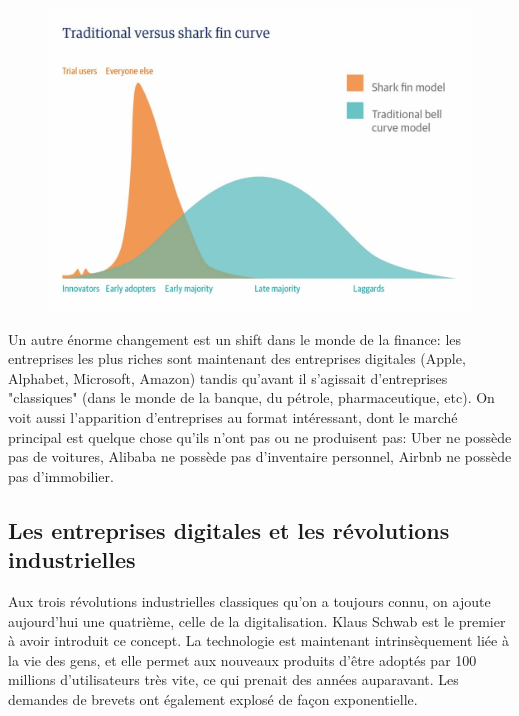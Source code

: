 \begin{figure}[H]
\centering
\includegraphics[scale=0.35]{../images/lec1img1}
\end{figure}

Un autre énorme changement est un shift dans le monde de la finance: les entreprises les plus riches sont maintenant des entreprises digitales (Apple, Alphabet, Microsoft, Amazon) tandis qu'avant il s'agissait d'entreprises "classiques" (dans le monde de la banque, du pétrole, pharmaceutique, etc). On voit aussi l'apparition d'entreprises au format intéressant, dont le marché principal est quelque chose qu'ils n'ont pas ou ne produisent pas: Uber ne possède pas de voitures, Alibaba ne possède pas d'inventaire personnel, Airbnb ne possède pas d'immobilier. \\

\newpage

\subsection{Les entreprises digitales et les révolutions industrielles}

Aux trois révolutions industrielles classiques qu'on a toujours connu, on ajoute aujourd'hui une quatrième, celle de la digitalisation. Klaus Schwab est le premier à avoir introduit ce concept. La technologie est maintenant intrinsèquement liée à la vie des gens, et elle permet aux nouveaux produits d'être adoptés par 100 millions d'utilisateurs très vite, ce qui prenait des années auparavant. Les demandes de brevets ont également explosé de façon exponentielle.


